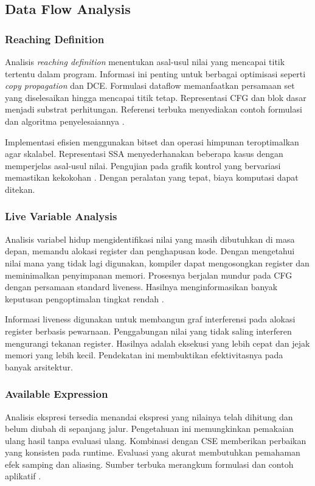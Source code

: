 \documentclass[../main.tex]{subfiles}
\begin{document}
\subsection{Data Flow Analysis}
\subsubsection{Reaching Definition}
Analisis \emph{reaching definition} menentukan asal-usul nilai yang mencapai titik tertentu dalam program. Informasi ini penting untuk berbagai optimisasi seperti \emph{copy propagation} dan DCE. Formulasi dataflow memanfaatkan persamaan set yang diselesaikan hingga mencapai titik tetap. Representasi CFG dan blok dasar menjadi substrat perhitungan. Referensi terbuka menyediakan contoh formulasi dan algoritma penyelesaiannya \citep{WikiReachingDef}.

Implementasi efisien menggunakan bitset dan operasi himpunan teroptimalkan agar skalabel. Representasi SSA menyederhanakan beberapa kasus dengan memperjelas asal-usul nilai. Pengujian pada grafik kontrol yang bervariasi memastikan kekokohan \citep{WikiReachingDef}. Dengan peralatan yang tepat, biaya komputasi dapat ditekan.

\subsubsection{Live Variable Analysis}
Analisis variabel hidup mengidentifikasi nilai yang masih dibutuhkan di masa depan, memandu alokasi register dan penghapusan kode. Dengan mengetahui nilai mana yang tidak lagi digunakan, kompiler dapat mengosongkan register dan meminimalkan penyimpanan memori. Prosesnya berjalan mundur pada CFG dengan persamaan standard liveness. Hasilnya menginformasikan banyak keputusan pengoptimalan tingkat rendah \citep{WikiLiveVariables}.

Informasi liveness digunakan untuk membangun graf interferensi pada alokasi register berbasis pewarnaan. Penggabungan nilai yang tidak saling interferen mengurangi tekanan register. Hasilnya adalah eksekusi yang lebih cepat dan jejak memori yang lebih kecil. Pendekatan ini membuktikan efektivitasnya pada banyak arsitektur.

\subsubsection{Available Expression}
Analisis ekspresi tersedia menandai ekspresi yang nilainya telah dihitung dan belum diubah di sepanjang jalur. Pengetahuan ini memungkinkan pemakaian ulang hasil tanpa evaluasi ulang. Kombinasi dengan CSE memberikan perbaikan yang konsisten pada runtime. Evaluasi yang akurat membutuhkan pemahaman efek samping dan aliasing. Sumber terbuka merangkum formulasi dan contoh aplikatif \citep{WikiAvailableExpr}.
\end{document}

